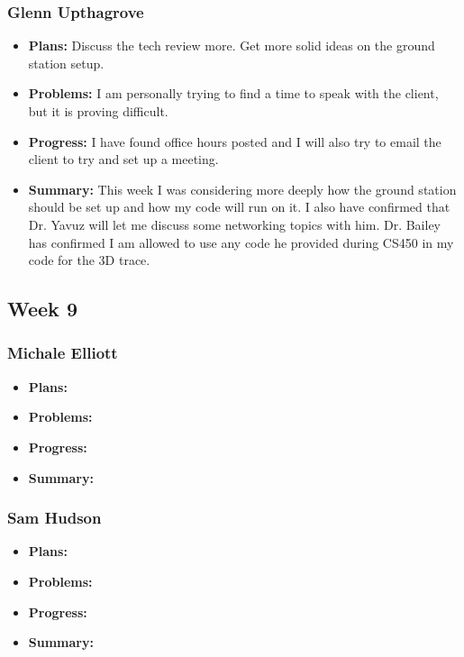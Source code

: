 \documentclass[onecolumn, draftclsnofoot,10pt, compsoc]{IEEEtran}
\begin{document}
\subsubsection{Glenn Upthagrove}
\begin {itemize}
 \item \textbf{Plans: }Discuss the tech review more. Get more solid ideas on the ground station setup. 
 \item \textbf{Problems: }I am personally trying to find a time to speak with the client, but it is proving difficult. 
 \item \textbf{Progress: }I have found office hours posted and I will also try to email the client to try and set up a meeting.
 \item \textbf{Summary: }This week I was considering more deeply how the ground station should be set up and how my code will run on it. I also have confirmed that Dr. Yavuz will let me discuss some networking topics with him. Dr. Bailey has confirmed I am allowed to use any code he provided during CS450 in my code for the 3D trace.  
\end {itemize}
\subsection {Week 9}
\subsubsection{Michale Elliott}
\begin {itemize}
 \item \textbf{Plans: }
 \item \textbf{Problems: }
 \item \textbf{Progress: }
 \item \textbf{Summary: }
\end {itemize}
\subsubsection{Sam Hudson}
\begin {itemize}
 \item \textbf{Plans: }
 \item \textbf{Problems: }
 \item \textbf{Progress: }
 \item \textbf{Summary: }
\end {itemize}
\end{document}
